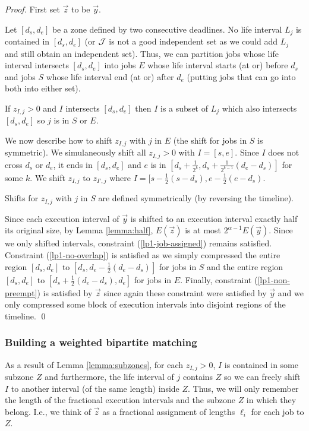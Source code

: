 \begin{proof}
  First set $\vec{z}$ to be $\vec{y}$.

  Let $[d_s,d_e]$ be a zone defined by two consecutive deadlines. No life interval $L_j$ is contained in $[d_s,d_e]$ (or $\cal{J}$ is not a good independent set as we could add $L_j$ and still obtain an independent set). Thus, we can partition jobs whose life interval intersects $[d_s,d_e]$ into jobs $E$ whose life interval starts (at or) before $d_s$ and jobs $S$ whose life interval end (at or) after $d_e$ (putting jobs that can go into both into either set).

  If $z_{I,j}>0$ and $I$ intersects $[d_s,d_e]$ then $I$ is a subset of $L_j$ which also intersects $[d_s,d_e]$ so $j$ is in $S$ or $E$.

  We now describe how to shift $z_{I,j}$ with $j$ in $E$ (the shift for jobs in $S$ is symmetric). We simulaneously shift all $z_{I,j}>0$ with $I=[s,e]$. Since $I$ does not cross $d_s$ or $d_e$, it ends in $[d_s,d_e]$ and $e$ is in $[d_s + \frac{1}{2^k}, d_s + \frac{1}{2^{k-1}}(d_e-d_s)]$ for some $k$. We shift $z_{I,j}$ to $z_{I',j}$ where $I=[s-\frac{1}{2}(s-d_s) , e-\frac{1}{2}(e-d_s)$.

  Shifts for $z_{I,j}$ with $j$ in $S$ are defined symmetrically (by reversing the timeline).

  Since each execution interval of $\vec{y}$ is shifted to an execution interval exactly half its original size, by Lemma \ref{lemma:half}, $E(\vec{z})$ is at most $2^{\alpha-1}E(\vec{y})$.
  Since we only shifted intervals, constraint (\ref{lp1-job-assigned}) remains satisfied. Constraint (\ref{lp1-no-overlap}) is satisfied as we simply compressed the entire region $[d_s, d_e]$ to $[d_s, d_e-\frac{1}{2}(d_e-d_s)]$ for jobs in $S$ and the entire region $[d_s, d_e]$ to $[d_s +\frac{1}{2}(d_e-d_s), d_e]$ for jobs in $E$. Finally, constraint (\ref{lp1-non-preempt}) is satisfied by $\vec{z}$ since again these constraint were satisfied by $\vec{y}$ and we only compressed some block of execution intervals into disjoint regions of the timeline.
\qed\end{proof}

\subsubsection{Building a weighted bipartite matching}

As a result of Lemma \ref{lemma:subzones}, for each $z_{I,j}>0$, $I$ is contained in some subzone $Z$ and furthermore, the life interval of $j$ contains $Z$ so we can freely shift $I$ to another interval (of the same length) inside $Z$.
Thus, we will only remember the length of the fractional execution intervals and the subzone $Z$ in which they belong. I.e., we think of $\vec{z}$ as a fractional assignment of lengths $\ell_i$ for each job to $Z$.

